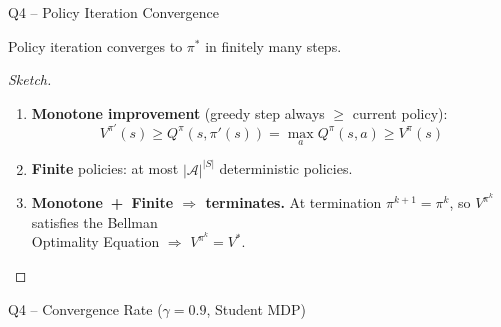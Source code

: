 \documentclass[aspectratio=169,12pt]{beamer}
\newcommand{\pistar}{\pi^{*}}
\begin{document}
\begin{frame}{Q4 -- Policy Iteration Convergence}
  \begin{theorem}
    Policy iteration converges to $\pistar$ in finitely many steps.
  \end{theorem}

  \begin{proof}[Sketch]
    \begin{enumerate}
      \item \textbf{Monotone improvement} (greedy step always $\geq$ current policy):
      \[
        V^{\pi'}(s)\geq Q^\pi(s,\pi'(s))=\max_a Q^\pi(s,a)\geq V^\pi(s)
      \]
      \item \textbf{Finite} policies: at most $|\mathcal{A}|^{|S|}$ deterministic policies.
      \item \textbf{Monotone~+~Finite $\Rightarrow$ terminates.}
        At termination $\pi^{k+1}=\pi^k$, so $V^{\pi^k}$ satisfies the Bellman\\
        Optimality Equation $\Rightarrow$ $V^{\pi^k}=V^*$.
    \end{enumerate}
  \end{proof}
\end{frame}

\begin{frame}{Q4 -- Convergence Rate ($\gamma=0.9$, Student MDP)}
  \begin{center}
  \end{center}
\end{frame}

\end{document}
